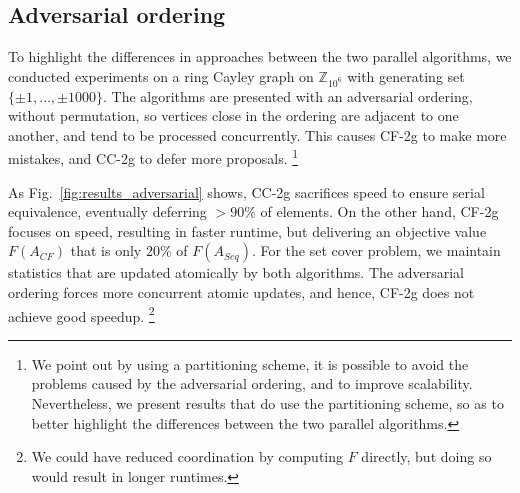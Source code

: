 \documentclass{article} %
\newcommand{\hogwild}{CF-2g}
\newcommand{\occ}{CC-2g}
\newcommand{\hogwildshort}{CF}
\newcommand{\seqalgshort}{Seq}
\newcommand{\Comments}{1}
\newcommand{\note}[2]{\ifnum\Comments=1\textcolor{#1}{#2}\fi}
\newcommand{\xinghao}[1]{\note{red}{[XP: #1]}}
\newcommand{\figref}[1]{Fig.~\ref{#1}}
\begin{document}
\subsection{Adversarial ordering}

To highlight the differences in approaches between the two parallel algorithms, we conducted experiments on a ring Cayley graph on $\mathbb{Z}_{10^6}$ with generating set $\{\pm 1,\dots, \pm 1000\}$.
The algorithms are presented with an adversarial ordering, without permutation, so vertices close in the ordering are adjacent to one another, and tend to be processed concurrently.
This causes \hogwild{} to make more mistakes, and \occ{} to defer more proposals.
\footnote{
We point out by using a partitioning scheme, it is possible to avoid the problems caused by the adversarial ordering, and to improve scalability.
Nevertheless, we present results that do use the partitioning scheme, so as to better highlight the differences between the two parallel algorithms.
}

As \figref{fig:results_adversarial} shows, \occ{}  sacrifices speed to ensure serial equivalence, eventually deferring $>90\%$ of elements.
On the other hand, \hogwild{} focuses on speed, resulting in faster runtime, but delivering an objective value $F(A_{\hogwildshort{}})$ that is only $20\%$ of $F(A_{\seqalgshort{}})$.
For the set cover problem, we maintain statistics that are updated atomically by both algorithms.
The adversarial ordering forces more concurrent atomic updates, and hence, \hogwild{} does not achieve good speedup.
\footnote{We could have reduced coordination by computing $F$ directly, but doing so would result in longer runtimes.}
\end{document}
